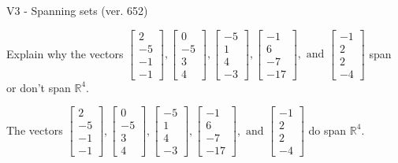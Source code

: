 \begin{exercise}
  \begin{exerciseTitle}V3 - Spanning sets (ver. 652)\end{exerciseTitle}
  \begin{exerciseStatement}
    Explain why the vectors \(\left[\begin{array}{r}
2 \\
-5 \\
-1 \\
-1
\end{array}\right] , \left[\begin{array}{r}
0 \\
-5 \\
3 \\
4
\end{array}\right] , \left[\begin{array}{r}
-5 \\
1 \\
4 \\
-3
\end{array}\right] , \left[\begin{array}{r}
-1 \\
6 \\
-7 \\
-17
\end{array}\right] , \text{ and } \left[\begin{array}{r}
-1 \\
2 \\
2 \\
-4
\end{array}\right]\) span or don't span \(\mathbb{R}^4\). 
	


  \end{exerciseStatement}
  \begin{exerciseAnswer}
   The vectors \(\left[\begin{array}{r}
2 \\
-5 \\
-1 \\
-1
\end{array}\right] , \left[\begin{array}{r}
0 \\
-5 \\
3 \\
4
\end{array}\right] , \left[\begin{array}{r}
-5 \\
1 \\
4 \\
-3
\end{array}\right] , \left[\begin{array}{r}
-1 \\
6 \\
-7 \\
-17
\end{array}\right] , \text{ and } \left[\begin{array}{r}
-1 \\
2 \\
2 \\
-4
\end{array}\right]\) 
  	 do  
	span \(\mathbb{R}^4\).
  



\end{exerciseAnswer}
\end{exercise}
